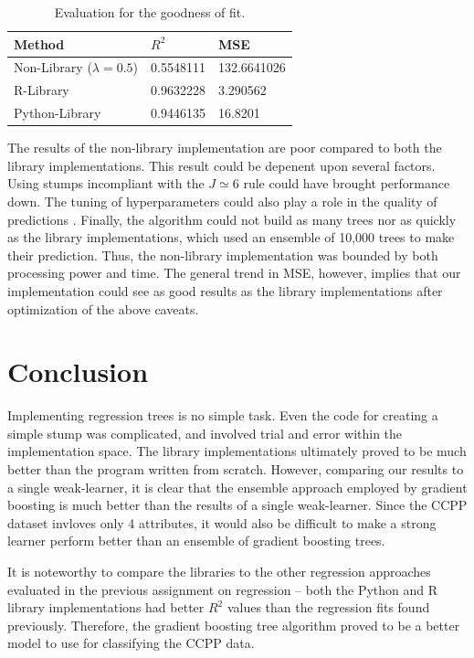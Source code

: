 \documentclass[letterpaper]{article} %
\begin{document}
\begin{table}[t]
\begin{centering}
\bgroup
\def\arraystretch{1.5}
\begin{tabular}{| m{} | m{} | m{}|} 
\hline
Method & $R^2$ & MSE \\ 
\hline
\hline
Non-Library ($\lambda = 0.5$) & 0.5548111 & 132.6641026 \\
\hline
R-Library & 0.9632228 & 3.290562 \\
\hline
Python-Library & 0.9446135 & 16.8201 \\
\hline
\end{tabular}
\caption{Evaluation for the goodness of fit.}
\label{tbl:goodness}
\egroup
\end{centering}
\end{table}

The results of the non-library implementation are poor
compared to both the library implementations. This result could be depenent upon several factors.
Using stumps incompliant with the $J \simeq 6$ rule could have brought performance down.
The tuning of hyperparameters could also play a role in the quality of predictions \cite{elements}.
Finally, the algorithm could not build as many trees nor as quickly as the library implementations,
which used an ensemble of 10,000 trees to make their prediction.
Thus, the non-library implementation was bounded by both processing power and time.
The general trend in MSE, however, implies that
our implementation could see as good results as the library implementations after optimization
of the above caveats.

\section{Conclusion}
Implementing regression trees is no simple task.
Even the code for creating a simple stump was complicated,
and involved trial and error within the implementation space.
The library implementations ultimately proved to be much better
than the program written from scratch.
However, comparing our results to a single weak-learner,
it is clear that the ensemble approach employed by
gradient boosting is much better than the results of a single weak-learner.
Since the CCPP dataset invloves only 4 attributes,
it would also be difficult to make a strong learner perform better than
an ensemble of gradient boosting trees.

It is noteworthy to compare the libraries to the other regression
approaches evaluated in the previous assignment on regression -- both the Python and R library implementations
had better $R^2$ values than the regression fits found previously.
Therefore, the gradient boosting tree algorithm proved to be a better model
to use for classifying the CCPP data.
\end{document}
